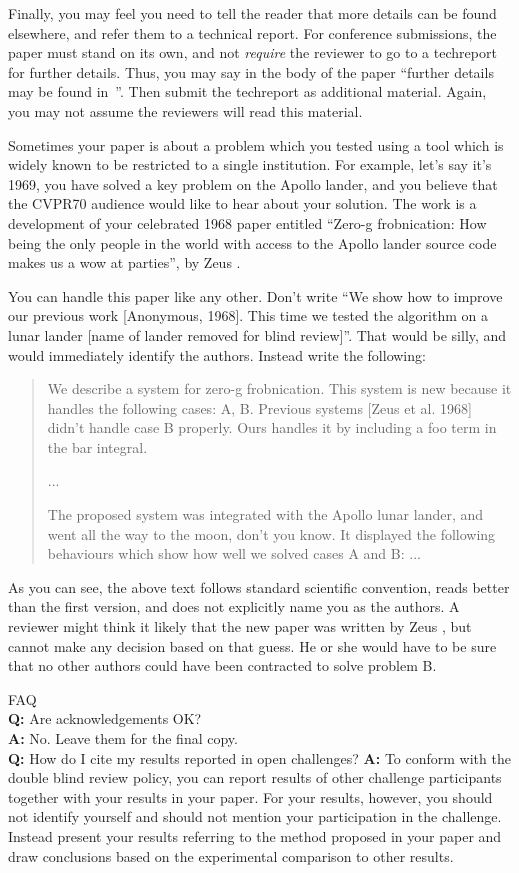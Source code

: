 \documentclass[10pt,twocolumn,letterpaper]{article}
\begin{document}
Finally, you may feel you need to tell the reader that more details can be
found elsewhere, and refer them to a technical report.  For conference
submissions, the paper must stand on its own, and not {\em require} the
reviewer to go to a techreport for further details.  Thus, you may say in
the body of the paper ``further details may be found
in~\cite{Authors14b}''.  Then submit the techreport as additional material.
Again, you may not assume the reviewers will read this material.

Sometimes your paper is about a problem which you tested using a tool which
is widely known to be restricted to a single institution.  For example,
let's say it's 1969, you have solved a key problem on the Apollo lander,
and you believe that the CVPR70 audience would like to hear about your
solution.  The work is a development of your celebrated 1968 paper entitled
``Zero-g frobnication: How being the only people in the world with access to
the Apollo lander source code makes us a wow at parties'', by Zeus \etal.

You can handle this paper like any other.  Don't write ``We show how to
improve our previous work [Anonymous, 1968].  This time we tested the
algorithm on a lunar lander [name of lander removed for blind review]''.
That would be silly, and would immediately identify the authors. Instead
write the following:
\begin{quotation}
\noindent
   We describe a system for zero-g frobnication.  This
   system is new because it handles the following cases:
   A, B.  Previous systems [Zeus et al. 1968] didn't
   handle case B properly.  Ours handles it by including
   a foo term in the bar integral.

   ...

   The proposed system was integrated with the Apollo
   lunar lander, and went all the way to the moon, don't
   you know.  It displayed the following behaviours
   which show how well we solved cases A and B: ...
\end{quotation}
As you can see, the above text follows standard scientific convention,
reads better than the first version, and does not explicitly name you as
the authors.  A reviewer might think it likely that the new paper was
written by Zeus \etal, but cannot make any decision based on that guess.
He or she would have to be sure that no other authors could have been
contracted to solve problem B.
\medskip

\noindent
FAQ\medskip\\
{\bf Q:} Are acknowledgements OK?\\
{\bf A:} No.  Leave them for the final copy.\medskip\\
{\bf Q:} How do I cite my results reported in open challenges?
{\bf A:} To conform with the double blind review policy, you can report results of other challenge participants together with your results in your paper. For your results, however, you should not identify yourself and should not mention your participation in the challenge. Instead present your results referring to the method proposed in your paper and draw conclusions based on the experimental comparison to other results.\medskip\\
\end{document}
